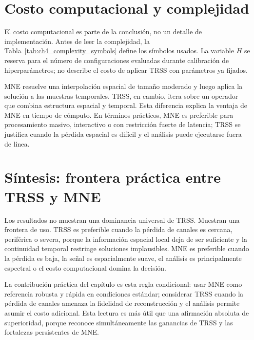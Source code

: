 \FloatBarrier

\section{Costo computacional y complejidad}
\label{sec:cap4_costo}

El costo computacional es parte de la conclusión, no un detalle de implementación. Antes de leer la complejidad, la Tabla~\ref{tab:ch4_complexity_symbols} define los símbolos usados. La variable $H$ se reserva para el número de configuraciones evaluadas durante calibración de hiperparámetros; no describe el costo de aplicar TRSS con parámetros ya fijados.





MNE resuelve una interpolación espacial de tamaño moderado y luego aplica la solución a las muestras temporales. TRSS, en cambio, itera sobre un operador que combina estructura espacial y temporal. Esta diferencia explica la ventaja de MNE en tiempo de cómputo. En términos prácticos, MNE es preferible para procesamiento masivo, interactivo o con restricción fuerte de latencia; TRSS se justifica cuando la pérdida espacial es difícil y el análisis puede ejecutarse fuera de línea.

\FloatBarrier

\section{Síntesis: frontera práctica entre TRSS y MNE}

Los resultados no muestran una dominancia universal de TRSS. Muestran una frontera de uso. TRSS es preferible cuando la pérdida de canales es cercana, periférica o severa, porque la información espacial local deja de ser suficiente y la continuidad temporal restringe soluciones implausibles. MNE es preferible cuando la pérdida es baja, la señal es espacialmente suave, el análisis es principalmente espectral o el costo computacional domina la decisión.



La contribución práctica del capítulo es esta regla condicional: usar MNE como referencia robusta y rápida en condiciones estándar; considerar TRSS cuando la pérdida de canales amenaza la fidelidad de reconstrucción y el análisis permite asumir el costo adicional. Esta lectura es más útil que una afirmación absoluta de superioridad, porque reconoce simultáneamente las ganancias de TRSS y las fortalezas persistentes de MNE.
